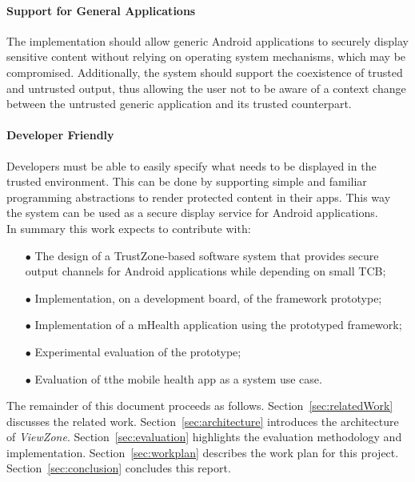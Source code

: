 \paragraph*{\textbf{Support for General Applications\\}} The implementation should allow generic Android applications to securely display sensitive content without relying on operating system mechanisms, which may be compromised. Additionally, the system should support the coexistence of trusted and untrusted output, thus allowing the user not to be aware of a context change between the untrusted generic application and its trusted counterpart.

\paragraph*{\textbf{Developer Friendly\\}} Developers must be able to easily specify what needs to be displayed in the trusted environment. This can be done by supporting simple and familiar programming abstractions to render protected content in their apps. This way the system can be used as a secure display service for Android applications.\\

In summary this work expects to contribute with:
\begin{itemize}
	\item[$\bullet$] The design of a TrustZone-based software system that provides secure output channels for Android applications while depending on small TCB;
	\item[$\bullet$] Implementation, on a development board, of the framework prototype;
	\item[$\bullet$] Implementation of a mHealth application using the prototyped framework;
	\item[$\bullet$] Experimental evaluation of the prototype;
	\item[$\bullet$] Evaluation of tthe mobile health app as a system use case.
\end{itemize}

%
The remainder of this document proceeds as follows. Section~\ref{sec:relatedWork} discusses the related work. Section~\ref{sec:architecture} introduces the architecture of \emph{ViewZone}. Section~\ref{sec:evaluation} highlights the evaluation methodology and implementation. Section~\ref{sec:workplan} describes the work plan for this project. Section~\ref{sec:conclusion} concludes this report.